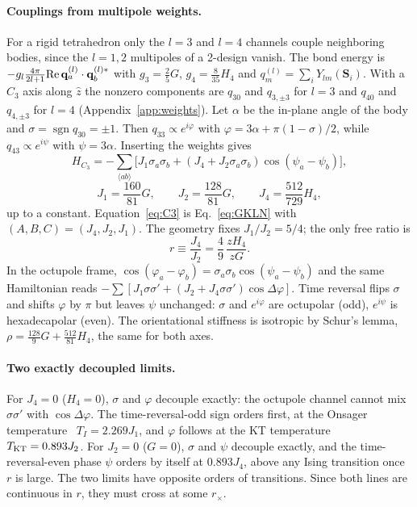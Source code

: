 \documentclass[pre,reprint,superscriptaddress,longbibliography,amsmath,amssymb,floatfix]{revtex4-2}
\newcommand{\Sv}{\mathbf{S}}
\begin{document}
\paragraph*{Couplings from multipole weights.} For a rigid tetrahedron only the $l=3$ and $l=4$ channels couple neighboring bodies, since the $l=1,2$ multipoles of a 2-design vanish. The bond energy is $-g_l\frac{4\pi}{2l+1}{\rm Re}\,\mathbf q^{(l)}_a\cdot\mathbf q^{(l)*}_b$ with $g_3=\frac25G$, $g_4=\frac{8}{35}H_4$ and $q^{(l)}_m=\sum_iY_{lm}(\Sv_i)$. With a $C_3$ axis along $\hat z$ the nonzero components are $q_{30}$ and $q_{3,\pm3}$ for $l=3$ and $q_{40}$ and $q_{4,\pm3}$ for $l=4$ (Appendix~\ref{app:weights}). Let $\alpha$ be the in-plane angle of the body and $\sigma=\operatorname{sgn}q_{30}=\pm1$. Then $q_{33}\propto e^{i\varphi}$ with $\varphi=3\alpha+\pi(1-\sigma)/2$, while $q_{43}\propto e^{i\psi}$ with $\psi=3\alpha$. Inserting the weights gives
\begin{equation}
H_{C_3}=-\sum_{\langle ab\rangle}\big[J_1\sigma_a\sigma_b+(J_4+J_2\sigma_a\sigma_b)\cos(\psi_a-\psi_b)\big],
\label{eq:C3}
\end{equation}
\begin{equation}
J_1=\frac{160}{81}G,\qquad J_2=\frac{128}{81}G,\qquad J_4=\frac{512}{729}H_4 ,
\label{eq:J}
\end{equation}
up to a constant. Equation~\eqref{eq:C3} is Eq.~\eqref{eq:GKLN} with $(A,B,C)=(J_4,J_2,J_1)$. The geometry fixes $J_1/J_2=5/4$; the only free ratio is
\begin{equation}
r\equiv\frac{J_4}{J_2}=\frac49\,\frac{zH_4}{zG}.
\label{eq:r}
\end{equation}
In the octupole frame, $\cos(\varphi_a-\varphi_b)=\sigma_a\sigma_b\cos(\psi_a-\psi_b)$ and the same Hamiltonian reads $-\sum[J_1\sigma\sigma'+(J_2+J_4\sigma\sigma')\cos\Delta\varphi]$. Time reversal flips $\sigma$ and shifts $\varphi$ by $\pi$ but leaves $\psi$ unchanged: $\sigma$ and $e^{i\varphi}$ are octupolar (odd), $e^{i\psi}$ is hexadecapolar (even). The orientational stiffness is isotropic by Schur's lemma, $\rho=\frac{128}{9}G+\frac{512}{81}H_4$, the same for both axes.

\paragraph*{Two exactly decoupled limits.} For $J_4=0$ ($H_4=0$), $\sigma$ and $\varphi$ decouple exactly: the octupole channel cannot mix $\sigma\sigma'$ with $\cos\Delta\varphi$. The time-reversal-odd sign orders first, at the Onsager temperature~\cite{Onsager1944} $T_I=2.269J_1$, and $\varphi$ follows at the KT temperature~\cite{KosterlitzThouless1973,Hasenbusch2005} $T_{\rm KT}=0.893J_2$. For $J_2=0$ ($G=0$), $\sigma$ and $\psi$ decouple exactly, and the time-reversal-even phase $\psi$ orders by itself at $0.893J_4$, above any Ising transition once $r$ is large. The two limits have opposite orders of transitions. Since both lines are continuous in $r$, they must cross at some $r_\times$.
\end{document}
